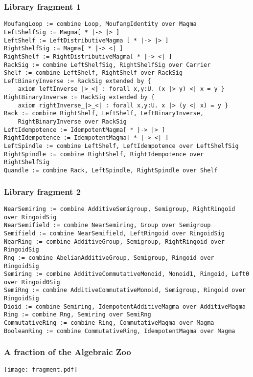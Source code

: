 \documentclass{beamer}
\begin{document}
\lstset{language=mathscheme,basicstyle=\scriptsize}
\begin{frame}[t,fragile]
\frametitle{Library fragment 1}
\begin{lstlisting}
MoufangLoop := combine Loop, MoufangIdentity over Magma
LeftShelfSig := Magma[ * |-> |> ]
LeftShelf := LeftDistributiveMagma [ * |-> |> ]
RightShelfSig := Magma[ * |-> <| ]
RightShelf := RightDistributiveMagma[ * |-> <| ]
RackSig := combine LeftShelfSig, RightShelfSig over Carrier
Shelf := combine LeftShelf, RightShelf over RackSig
LeftBinaryInverse := RackSig extended by {
    axiom leftInverse_|>_<| : forall x,y:U. (x |> y) <| x = y }
RightBinaryInverse := RackSig extended by {
    axiom rightInverse_|>_<| : forall x,y:U. x |> (y <| x) = y }
Rack := combine RightShelf, LeftShelf, LeftBinaryInverse, 
    RightBinaryInverse over RackSig
LeftIdempotence := IdempotentMagma[ * |-> |> ]
RightIdempotence := IdempotentMagma[ * |-> <| ]
LeftSpindle := combine LeftShelf, LeftIdempotence over LeftShelfSig
RightSpindle := combine RightShelf, RightIdempotence over RightShelfSig
Quandle := combine Rack, LeftSpindle, RightSpindle over Shelf
\end{lstlisting}
\end{frame}

\begin{frame}[t,fragile]
\frametitle{Library fragment 2}
\begin{lstlisting}
NearSemiring := combine AdditiveSemigroup, Semigroup, RightRingoid over RingoidSig
NearSemifield := combine NearSemiring, Group over Semigroup
Semifield := combine NearSemifield, LeftRingoid over RingoidSig
NearRing := combine AdditiveGroup, Semigroup, RightRingoid over RingoidSig
Rng := combine AbelianAdditiveGroup, Semigroup, Ringoid over RingoidSig
Semiring := combine AdditiveCommutativeMonoid, Monoid1, Ringoid, Left0 over Ringoid0Sig
SemiRng := combine AdditiveCommutativeMonoid, Semigroup, Ringoid over RingoidSig
Dioid := combine Semiring, IdempotentAdditiveMagma over AdditiveMagma
Ring := combine Rng, Semiring over SemiRng
CommutativeRing := combine Ring, CommutativeMagma over Magma
BooleanRing := combine CommutativeRing, IdempotentMagma over Magma
\end{lstlisting}
\end{frame}

\begin{frame}[t]
\frametitle{A fraction of the Algebraic Zoo}
\vspace*{-0.8cm}\texttt{[image: fragment.pdf]}
\end{frame}
\end{document}
